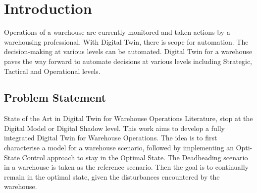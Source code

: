 

\chapter{Introduction}

Operations of a warehouse are currently monitored and taken actions by a 
warehousing professional. With Digital Twin, there is scope for automation. 
The decision-making at various levels can be automated. Digital Twin for a warehouse 
paves the way forward to automate decisions at various levels including Strategic, Tactical 
and Operational levels.

\section{Problem Statement}

State of the Art in Digital Twin for Warehouse Operations Literature, stop at the Digital Model or Digital Shadow level. This work aims to develop a 
fully integrated Digital Twin for Warehouse Operations. The idea is to first characterise a model for a warehouse scenario, followed by implementing 
an Opti-State Control approach to stay in the Optimal State. The Deadheading scenario in a warehouse is taken as the reference scenario. Then the goal is to 
continually remain in the optimal state, given the disturbances encountered by the warehouse.
